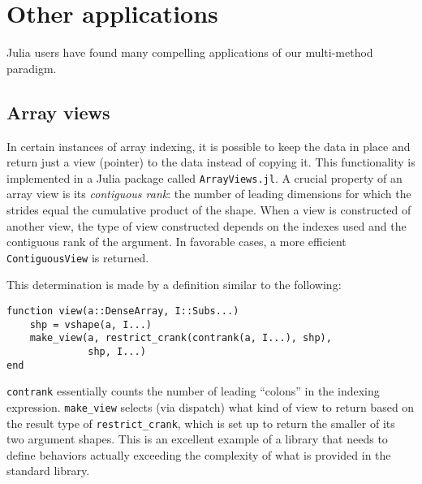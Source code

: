 \documentclass[preprint]{sigplanconf}
\newcommand{\code}[1]{\texttt{#1}}
\begin{document}


\section{Other applications}

Julia users have found many compelling applications of our multi-method
paradigm.

\subsection{Array views}

In certain instances of array indexing, it is
possible to keep the data in place and return just a view (pointer) to the
data instead of copying it. This functionality is implemented in a Julia
package called \code{ArrayViews.jl}\cite{Lin:2014av}. A crucial property
of an array view is its \emph{contiguous rank}: the number of leading
dimensions for which the strides equal the cumulative product of the shape.
When a view is constructed of another view, the type of view constructed
depends on the indexes used and the contiguous rank of the argument. In
favorable cases, a more efficient \code{ContiguousView} is returned.

This determination is made by a definition similar to the following:

{\small
\begin{verbatim}
function view(a::DenseArray, I::Subs...)
    shp = vshape(a, I...)
    make_view(a, restrict_crank(contrank(a, I...), shp),
              shp, I...)
end
\end{verbatim}
}

\code{contrank} essentially counts the number of leading ``colons'' in the
indexing expression. \code{make\_view} selects (via dispatch) what kind of
view to return based on the result type of \code{restrict\_crank}, which is
set up to return the smaller of its two argument shapes.
This is an excellent example of a library that needs to define behaviors
actually exceeding the complexity of what is provided in the standard library.
\end{document}
